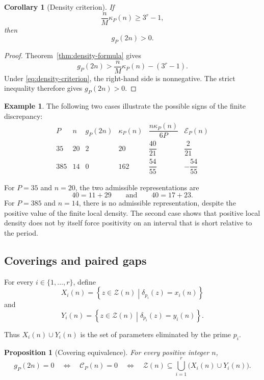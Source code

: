 \documentclass[12pt]{article}
\numberwithin{equation}{section}
\newtheorem{proposition}[theorem]{Proposition}
\newtheorem{corollary}[theorem]{Corollary}
\theoremstyle{definition}
\newtheorem{example}[theorem]{Example}
\theoremstyle{remark}
\newcommand{\Ccal}{\mathcal C}
\newcommand{\Zcal}{\mathcal Z}
\newcommand{\Ecal}{\mathcal E}
\begin{document}
\begin{corollary}[Density criterion]
\label{cor:density-positivity}
If
\begin{equation}
\label{eq:density-criterion}
\frac{n}{M}\kappa_P(n)\geq3^r-1,
\end{equation}
then
\[
g_P(2n)>0.
\]
\end{corollary}

\begin{proof}
Theorem~\ref{thm:density-formula} gives
\[
g_P(2n)
>
\frac{n}{M}\kappa_P(n)-(3^r-1).
\]
Under \eqref{eq:density-criterion}, the right-hand side is
nonnegative. The strict inequality therefore gives
$g_P(2n)>0$.
\end{proof}

\begin{example}
The following two cases illustrate the possible signs of the
finite discrepancy:
\[
\begin{array}{c|c|c|c|c|c}
P & n & g_P(2n) & \kappa_P(n)
& \dfrac{n\kappa_P(n)}{6P} & \Ecal_P(n)\\
\hline
35 & 20 & 2 & 20 & \dfrac{40}{21} & \dfrac{2}{21}\\[6pt]
385 & 14 & 0 & 162 & \dfrac{54}{55} & -\dfrac{54}{55}
\end{array}
\]

For $P=35$ and $n=20$, the two admissible representations are
\[
40=11+29
\qquad\text{and}\qquad
40=17+23.
\]
For $P=385$ and $n=14$, there is no admissible representation,
despite the positive value of the finite local density. The
second case shows that positive local density does not by itself
force positivity on an interval that is short relative to the
period.
\end{example}

\subsection{Coverings and paired gaps}

For every $i\in\{1,\dots,r\}$, define
\[
X_i(n)
=
\left\{
z\in\Zcal(n)
\mathrel{}\middle|\mathrel{}
\delta_{p_i}(z)=x_i(n)
\right\}
\]
and
\[
Y_i(n)
=
\left\{
z\in\Zcal(n)
\mathrel{}\middle|\mathrel{}
\delta_{p_i}(z)=y_i(n)
\right\}.
\]

Thus $X_i(n)\cup Y_i(n)$ is the set of parameters eliminated
by the prime $p_i$.

\begin{proposition}[Covering equivalence]
\label{prop:covering}
For every positive integer $n$,
\begin{equation}
\label{eq:covering-equivalence}
g_P(2n)=0
\quad\Longleftrightarrow\quad
\Ccal_P(n)=0
\quad\Longleftrightarrow\quad
\Zcal(n)
\subseteq
\bigcup_{i=1}^{r}
\bigl(X_i(n)\cup Y_i(n)\bigr).
\end{equation}
\end{proposition}
\end{document}
